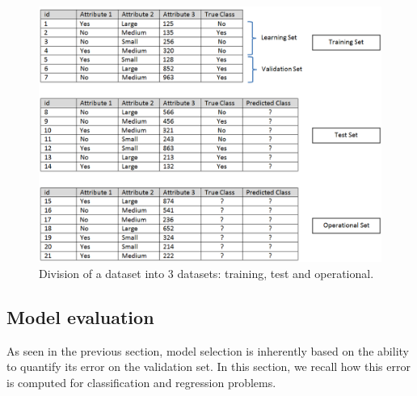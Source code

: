 \begin{figure}[h!]
	\centering
	\includegraphics[width=0.9\linewidth]{images/Dataset}
	\caption{Division of a dataset into 3 datasets: training, test and operational.}
	\label{fig:Dataset}
\end{figure}




\newpage
\subsection{Model evaluation}

As seen in the previous section, model selection is inherently based on the ability to quantify its error on the validation set. In this section, we recall how this error is computed for classification and regression problems.

